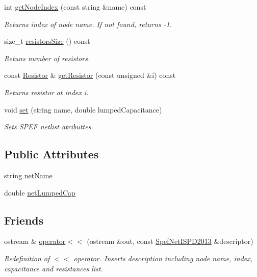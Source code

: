 \begin{DoxyCompactItemize}
int \hyperlink{classSpefNetISPD2013_aa5143da0b98e3fa1613562061238f4ee}{get\-Node\-Index} (const string \&name) const 
\begin{DoxyCompactList}\small\item\em Returns index of node name. If not found, returns -\/1. \end{DoxyCompactList}\item 
size\-\_\-t \hyperlink{classSpefNetISPD2013_a1a15314aec6fae289f90b9e7de201fe8}{resistors\-Size} () const 
\begin{DoxyCompactList}\small\item\em Retuns number of resistors. \end{DoxyCompactList}\item 
const \hyperlink{structSpefNetISPD2013_1_1Resistor}{Resistor} \& \hyperlink{classSpefNetISPD2013_a1baa70cdf4b2c65a7e695849c2ad2525}{get\-Resistor} (const unsigned \&i) const 
\begin{DoxyCompactList}\small\item\em Returns resistor at index i. \end{DoxyCompactList}\item 
void \hyperlink{classSpefNetISPD2013_a3a0ed208b150100bda0544112fb1c0ba}{set} (string name, double lumped\-Capacitance)
\begin{DoxyCompactList}\small\item\em Sets S\-P\-E\-F netlist atributtes. \end{DoxyCompactList}\end{DoxyCompactItemize}
\subsection*{Public Attributes}
\begin{DoxyCompactItemize}
\item 
string \hyperlink{classSpefNetISPD2013_a1aa3f32d0cac9a7b1800ab67903361fa}{net\-Name}
\item 
double \hyperlink{classSpefNetISPD2013_af088c8d7cbca748a4a56ab796ccb2fd5}{net\-Lumped\-Cap}
\end{DoxyCompactItemize}
\subsection*{Friends}
\begin{DoxyCompactItemize}
\item 
ostream \& \hyperlink{classSpefNetISPD2013_a6a52417a5250abf94d511910add3415e}{operator$<$$<$} (ostream \&out, const \hyperlink{classSpefNetISPD2013}{Spef\-Net\-I\-S\-P\-D2013} \&descriptor)
\begin{DoxyCompactList}\small\item\em Redefinition of $<$$<$ operator. Inserts description including node name, index, capacitance and resistances list. \end{DoxyCompactList}\end{DoxyCompactItemize}


